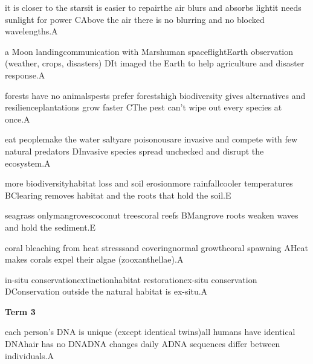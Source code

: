 \begin{gradebody}
{it is closer to the stars}{it is easier to repair}{the air blurs and absorbs light}{it needs sunlight for power}
{C}{Above the air there is no blurring and no blocked wavelengths.}{A}

{a Moon landing}{communication with Mars}{human spaceflight}{Earth observation (weather, crops, disasters)}
{D}{It imaged the Earth to help agriculture and disaster response.}{A}

{forests have no animals}{pests prefer forests}{high biodiversity gives alternatives and resilience}{plantations grow faster}
{C}{The pest can't wipe out every species at once.}{A}

{eat people}{make the water salty}{are poisonous}{are invasive and compete with few natural predators}
{D}{Invasive species spread unchecked and disrupt the ecosystem.}{A}

{more biodiversity}{habitat loss and soil erosion}{more rainfall}{cooler temperatures}
{B}{Clearing removes habitat and the roots that hold the soil.}{E}

{seagrass only}{mangroves}{coconut trees}{coral reefs}
{B}{Mangrove roots weaken waves and hold the sediment.}{E}

{coral bleaching from heat stress}{sand covering}{normal growth}{coral spawning}
{A}{Heat makes corals expel their algae (zooxanthellae).}{A}

{in-situ conservation}{extinction}{habitat restoration}{ex-situ conservation}
{D}{Conservation outside the natural habitat is ex-situ.}{A}

\textbf{Term 3}

{each person's DNA is unique (except identical twins)}{all humans have identical DNA}{hair has no DNA}{DNA changes daily}
{A}{DNA sequences differ between individuals.}{A}


\end{gradebody}
